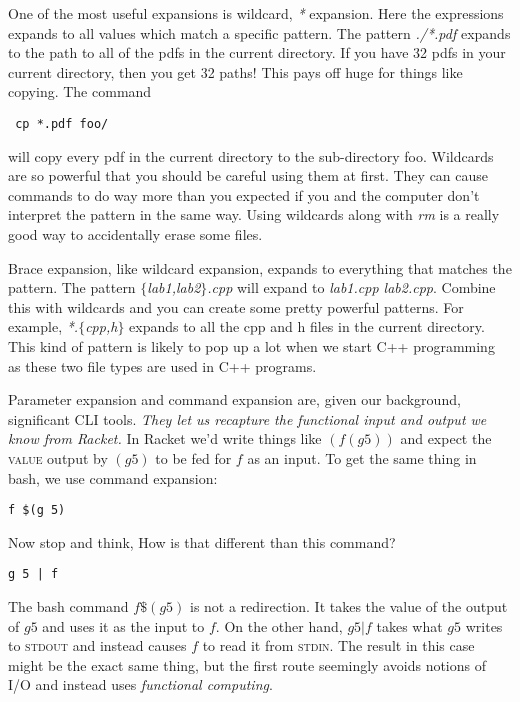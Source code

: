 \documentclass[]{tufte-handout}
\begin{document}
One of the most useful expansions is wildcard, \textit{*} expansion.  Here the expressions expands to all values which match a specific pattern.  The pattern \textit{./*.pdf} expands to the path to all of the pdfs in the current directory.  If you have 32 pdfs in your current directory, then you get 32 paths! This pays off huge for things like copying.  The command \begin{verbatim} cp *.pdf foo/ \end{verbatim} will copy every pdf in the current directory to the sub-directory foo.  Wildcards are so powerful that you should be careful using them at first.  They can cause commands to do way more than you expected if you and the computer don't interpret the pattern in the same way.  Using wildcards along with \textit{rm} is a really good way to accidentally erase some files.  

Brace expansion, like wildcard expansion, expands to everything that matches the pattern. The pattern \textit{$\{$lab1,lab2$\}$.cpp} will expand to \textit{lab1.cpp lab2.cpp}.  Combine this with wildcards and you can create some pretty powerful patterns.  For example, \textit{*.$\{$cpp,h$\}$} expands to all the cpp and h files in the current directory.  This kind of pattern is likely to pop up a lot when we start C++ programming as these two file types are used in C++ programs.


Parameter expansion and command expansion are, given our background, significant CLI tools. \textit{They let us recapture the functional input and output we know from Racket.} In Racket we'd write things like $(f (g 5))$ and expect the \textsc{value} output by $(g 5)$ to be fed for $f$ as an input.  To get the same thing in bash, we use command expansion:
\begin{verbatim}
f $(g 5)
\end{verbatim}
Now stop and think, How is that different than this command?
\begin{verbatim}
g 5 | f
\end{verbatim}

The bash command $f \$(g 5)$ is not a redirection. It takes the value of the output of $g 5$ and uses it as the input to $f$. On the other hand, $g 5 | f$ takes what $g 5$ writes to \textsc{stdout} and instead causes $f$ to read it from \textsc{stdin}.  The result in this case might be the exact same thing, but the first route seemingly avoids notions of \textsc{I/O} and instead uses \textit{functional computing}.   
\end{document}
